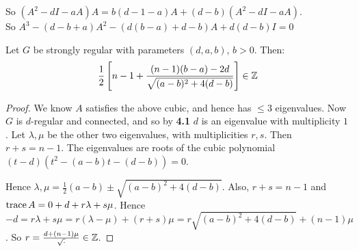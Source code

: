 \documentclass[10pt,a4paper]{article}
\begin{document}
So $(A^2 - dI - aA)A = b(d-1-a)A + (d-b)(A^2 - dI - aA)$.\\
So $A^3 - (d-b+a)A^2 - (d(b-a) + d-b)A + d(d-b)I = 0$
\begin{theorem}
Let $G$ be strongly regular with parameters $(d,a,b)$, $b>0$. Then:
\begin{align*}
\frac{1}{2}\left[ n-1 + \frac{(n-1)(b-a)-2d}{\sqrt{(a-b)^2 + 4(d-b)}}\right] \in \mathbb{Z}
\end{align*}
\end{theorem}
\begin{proof}
We know $A$ satisfies the above cubic, and hence has $\leq 3$ eigenvalues. Now $G$ is $d$-regular and connected, and so by \textbf{4.1} $d$ is an eigenvalue with multiplicity $1$. Let $\lambda, \mu$ be the other two eigenvalues, with multiplicities $r, s$. Then $r+s=n-1$. The eigenvalues are roots of the cubic polynomial $(t-d)(t^2-(a-b)t-(d-b)) = 0$.

Hence $\lambda, \mu = \frac{1}{2}(a-b)\pm \sqrt{(a-b)^2+4(d-b)}$. Also, $r+s = n-1$ and $\operatorname{trace} A = 0 + d + r\lambda + s\mu$. Hence $-d = r\lambda + s\mu = r(\lambda-\mu) + (r+s)\mu = r\sqrt{(a-b)^2 +4(d-b)} + (n-1)\mu$. So $r = \frac{d+(n-1)\mu}{\sqrt{\cdot}} \in \mathbb{Z}$.
\end{proof}
\end{document}
